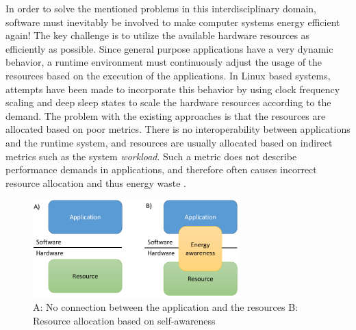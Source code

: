 \documentclass{article}
\begin{document}
In order to solve the mentioned problems in this interdisciplinary domain, software must inevitably be involved to make computer systems energy efficient again!
The key challenge is to utilize the available hardware resources as efficiently as possible.
Since general purpose applications have a very dynamic behavior, a runtime environment must continuously adjust the usage of the resources based on the execution of the applications.
In Linux based systems, attempts have been made to incorporate this behavior by using clock frequency scaling and deep sleep states to scale the hardware resources according to the demand. 
The problem with the existing approaches is that the resources are allocated based on poor metrics.
There is no interoperability between applications and the runtime system, and resources are usually allocated based on indirect metrics such as the system \textit{workload}.
Such a metric does not describe performance demands in applications, and therefore often causes incorrect resource allocation and thus energy waste \cite{HolmbackaDasip, HolmbackaHipeac}.
\smallskip

\begin{figure}
    \includegraphics[width=8.0cm]{fig/EAS_Overview.png}
  \caption{A: No connection between the application and the resources B: Resource allocation based on self-awareness}
  \label{fig:EAS}
\end{figure}
\end{document}
